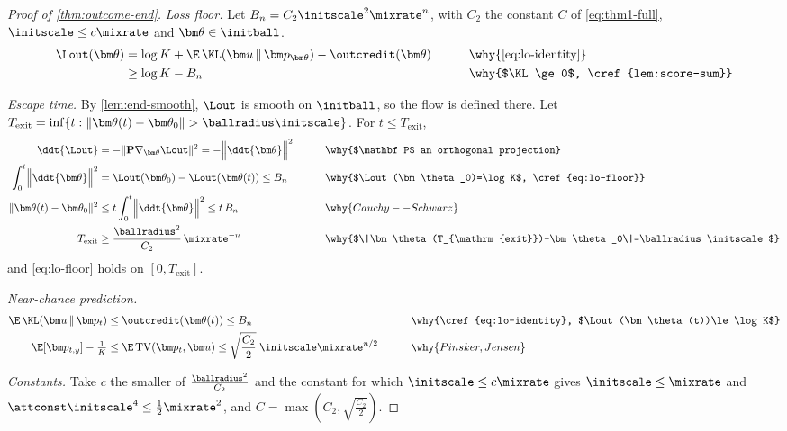 \begin{proof}[Proof of \cref{thm:outcome-end}]
\emph{Loss floor.} Let $B_n=C_2\initscale^2\mixrate^n$, with $C_2$ the constant $C$ of \cref{eq:thm1-full}, $\initscale\le c\mixrate$ and $\bm\theta\in\initball$.
\begin{alignat}{2}
 \Lout(\bm\theta)&=\log K+\E\,\KL(\bm u\,\|\,\bm p_{\bm\theta})-\outcredit(\bm\theta) &\qquad& \why{\cref{eq:lo-identity}}\nonumber\\
 &\ge\log K-B_n && \why{$\KL\ge0$, \cref{lem:score-sum}}\label{eq:lo-floor}
\end{alignat}

\emph{Escape time.} By \cref{lem:end-smooth}, $\Lout$ is smooth on $\initball$, so the flow is defined there. Let
$T_{\mathrm{exit}}=\inf\{t:\|\bm\theta(t)-\bm\theta_0\|>\ballradius\initscale\}$. For $t\le T_{\mathrm{exit}}$,
\begin{alignat*}{2}
 \ddt{\Lout}&=-\|\mathbf P\nabla_{\bm\theta}\Lout\|^2=-\Bigl\|\ddt{\bm\theta}\Bigr\|^2 &\qquad& \why{$\mathbf P$ an orthogonal projection}\\
 \int_0^t\Bigl\|\ddt{\bm\theta}\Bigr\|^2&=\Lout(\bm\theta_0)-\Lout(\bm\theta(t))\le B_n && \why{$\Lout(\bm\theta_0)=\log K$, \cref{eq:lo-floor}}\\
 \|\bm\theta(t)-\bm\theta_0\|^2&\le t\int_0^t\Bigl\|\ddt{\bm\theta}\Bigr\|^2\le t\,B_n && \why{Cauchy--Schwarz}\\
 T_{\mathrm{exit}}&\ge\frac{\ballradius^2}{C_2}\,\mixrate^{-n} && \why{$\|\bm\theta(T_{\mathrm{exit}})-\bm\theta_0\|=\ballradius\initscale$}
\end{alignat*}
and \cref{eq:lo-floor} holds on $[0,T_{\mathrm{exit}}]$.

\emph{Near-chance prediction.}
\begin{alignat*}{2}
 \E\,\KL(\bm u\,\|\,\bm p_t)&\le\outcredit(\bm\theta(t))\le B_n &\qquad& \why{\cref{eq:lo-identity}, $\Lout(\bm\theta(t))\le\log K$}\\
 \E[\bm p_{t,y}]-\tfrac{1}{K}&\le\E\,\mathrm{TV}(\bm p_t,\bm u)\le\sqrt{\frac{C_2}{2}}\;\initscale\mixrate^{n/2} && \why{Pinsker, Jensen}
\end{alignat*}

\emph{Constants.} Take $c$ the smaller of $\frac{\ballradius^2}{C_2}$ and the constant for which $\initscale\le c\mixrate$ gives $\initscale\le\mixrate$ and
$\attconst\initscale^4\le\frac{1}{2}\mixrate^2$, and $C=\max(C_2,\sqrt{\frac{C_2}{2}})$.
\end{proof}
